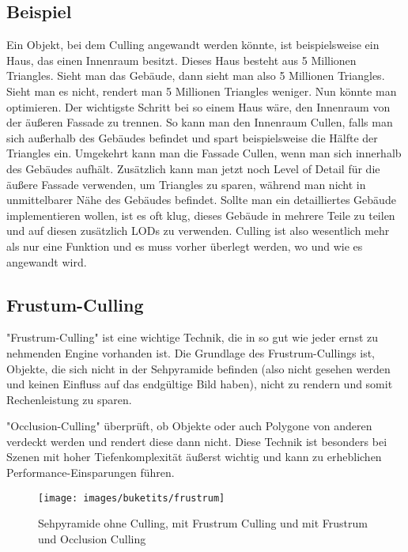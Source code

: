 \subsection{Beispiel}
Ein Objekt, bei dem Culling angewandt werden könnte, ist beispielsweise ein Haus, das einen Innenraum besitzt. Dieses Haus besteht aus 5 Millionen Triangles. Sieht man das Gebäude, dann sieht man also 5 Millionen Triangles. Sieht man es nicht, rendert man 5 Millionen Triangles weniger. Nun könnte man optimieren.\cite{_cryengine_culling}
Der wichtigste Schritt bei so einem Haus wäre, den Innenraum von der äußeren Fassade zu trennen. So kann man den Innenraum Cullen, falls man sich außerhalb des Gebäudes befindet und spart beispielsweise die Hälfte der Triangles ein. Umgekehrt kann man die Fassade Cullen, wenn man sich innerhalb des Gebäudes aufhält.\cite{_cryengine_culling}
Zusätzlich kann man jetzt noch Level of Detail für die äußere Fassade verwenden, um Triangles zu sparen, während man nicht in unmittelbarer Nähe des Gebäudes befindet. Sollte man ein detailliertes Gebäude implementieren wollen, ist es oft klug, dieses Gebäude in mehrere Teile zu teilen und auf diesen zusätzlich LODs zu verwenden. Culling ist also wesentlich mehr als nur eine Funktion und es muss vorher überlegt werden, wo und wie es angewandt wird.
\cite{_cryengine_culling}

\subsection{Frustum-Culling}
"Frustrum-Culling" ist eine wichtige Technik, die in so gut wie jeder ernst zu nehmenden Engine vorhanden ist. Die Grundlage des Frustrum-Cullings ist, Objekte, die sich nicht in der Sehpyramide befinden (also nicht gesehen werden und keinen Einfluss auf das endgültige Bild haben), nicht zu rendern und somit Rechenleistung zu sparen.
\cite{_cryengine_culling}

"Occlusion-Culling" überprüft, ob Objekte oder auch Polygone von anderen verdeckt werden und rendert diese dann nicht. Diese Technik ist besonders bei Szenen mit hoher Tiefenkomplexität äußerst wichtig und kann zu erheblichen Performance-Einsparungen führen.
\cite{_cryengine_culling}

\begin{figure}[H]
	\centering
	\texttt{[image: images/buketits/frustrum]}
	\caption{Sehpyramide ohne Culling, mit Frustrum Culling und mit Frustrum und Occlusion Culling\cite{_culling}}
\end{figure}

